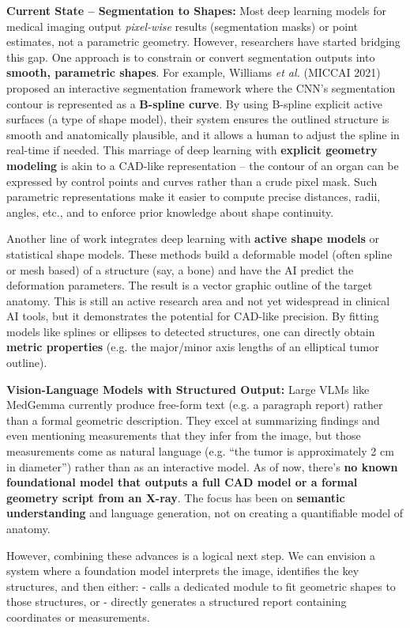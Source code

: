 \documentclass[
]{article}
\begin{document}
\textbf{Current State -- Segmentation to Shapes:} Most deep learning
models for medical imaging output \emph{pixel-wise} results
(segmentation masks) or point estimates, not a parametric geometry.
However, researchers have started bridging this gap. One approach is to
constrain or convert segmentation outputs into \textbf{smooth,
parametric shapes}. For example, Williams \emph{et al.} (MICCAI 2021)
proposed an interactive segmentation framework where the CNN's
segmentation contour is represented as a \textbf{B-spline
curve}\cite{key-38}.
By using B-spline explicit active surfaces (a type of shape model),
their system ensures the outlined structure is smooth and anatomically
plausible, and it allows a human to adjust the spline in real-time if
needed\cite{key-38}.
This marriage of deep learning with \textbf{explicit geometry modeling}
is akin to a CAD-like representation -- the contour of an organ can be
expressed by control points and curves rather than a crude pixel mask.
Such parametric representations make it easier to compute precise
distances, radii, angles, etc., and to enforce prior knowledge about
shape continuity.

Another line of work integrates deep learning with \textbf{active shape
models} or statistical shape models. These methods build a deformable
model (often spline or mesh based) of a structure (say, a bone) and have
the AI predict the deformation parameters. The result is a vector
graphic outline of the target anatomy. This is still an active research
area and not yet widespread in clinical AI tools, but it demonstrates
the potential for CAD-like precision. By fitting models like splines or
ellipses to detected structures, one can directly obtain \textbf{metric
properties} (e.g. the major/minor axis lengths of an elliptical tumor
outline).

\textbf{Vision-Language Models with Structured Output:} Large VLMs like
MedGemma currently produce free-form text (e.g. a paragraph report)
rather than a formal geometric description. They excel at summarizing
findings and even mentioning measurements that they infer from the
image, but those measurements come as natural language (e.g. ``the tumor
is approximately 2 cm in diameter'') rather than as an interactive
model. As of now, there's \textbf{no known foundational model that
outputs a full CAD model or a formal geometry script from an X-ray}. The
focus has been on \textbf{semantic understanding} and language
generation, not on creating a quantifiable model of anatomy.

However, combining these advances is a logical next step. We can
envision a system where a foundation model interprets the image,
identifies the key structures, and then either: - calls a dedicated
module to fit geometric shapes to those structures, or - directly
generates a structured report containing coordinates or measurements.
\end{document}
